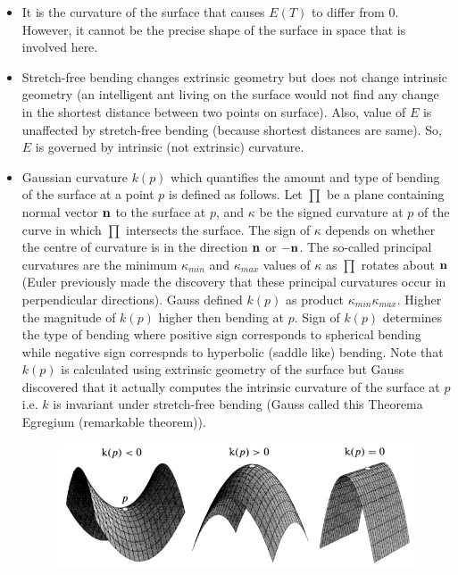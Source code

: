 \documentclass[12pt]{article}
\def\mf{\ensuremath\mathbf}
\begin{document}
\begin{itemize}
    \item It is the curvature of the surface that causes $E(T)$ to differ from $0$. However, it cannot be the precise shape of the surface in space that is involved here.

    \item Stretch-free bending changes extrinsic geometry but does not change intrinsic geometry (an intelligent ant living on the surface would not find any change in the shortest distance between two points on surface). Also, value of $E$ is unaffected by stretch-free bending (because shortest distances are same). So, $E$ is governed by intrinsic (not extrinsic) curvature.

    \item Gaussian curvature $k(p)$ which quantifies the amount and type of bending of the surface at a point $p$ is defined as follows. Let $\prod$ be a plane containing normal vector $\mf{n}$ to the surface at $p$, and $\kappa$ be the signed curvature at $p$ of the curve in which $\prod$ intersects the surface. The sign of $\kappa$ depends on whether the centre of curvature is in the direction $\mf{n}$ or $-\mf{n}$. The so-called principal curvatures are the minimum $\kappa_{min}$ and $\kappa_{max}$ values of $\kappa$ as $\prod$ rotates about $\mf{n}$ (Euler previously made the discovery that these principal curvatures occur in perpendicular directions). Gauss defined $k(p)$ as product $\kappa_{min}\kappa_{max}$. Higher the magnitude of $k(p)$ higher then bending at $p$. Sign of $k(p)$ determines the type of bending where positive sign corresponds to spherical bending while negative sign correspnds to hyperbolic (saddle like) bending. Note that $k(p)$ is calculated using extrinsic geometry of the surface but Gauss discovered that it actually computes the intrinsic curvature of the surface at $p$ i.e. $k$ is invariant under stretch-free bending (Gauss called this Theorema Egregium (remarkable theorem)).

    \begin{figure}[h!]
        \centering
        \includegraphics[scale=0.7]{fig_2}
        \label{fig_2}
    \end{figure}


\end{itemize}
\end{document}
